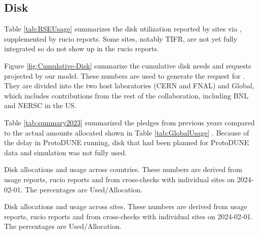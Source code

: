 \documentclass[12pt]{article}
\begin{document}
\subsection{Disk}
Table \ref{tab:RSEUsage} summarizes the disk utilization reported by sites via \cite{scotgrid}, supplemented by  rucio reports.   Some sites, notably TIFR, are not yet fully integrated so do not show up in the rucio reports.  %

Figure \ref{fig:Cumulative-Disk}  summarize the cumulative disk needs and requests projected by our model. These numbers are used to generate the request for \ThisYear.  They are divided into the two host laboratories (CERN and FNAL) and Global, which includes contributions from the rest of the collaboration, including  BNL and NERSC in the US. 

Table \ref{tab:summary2023} summarized the pledges from previous years compared to the actual amounts allocated shown in Table \ref{tab:GlobalUsage} .   Because of the delay in ProtoDUNE running, disk that had been planned for ProtoDUNE data and simulation was not fully used.  


\begin{table}[h]
\centering
{}
\caption{Disk allocations and usage across countries.    These numbers are derived from usage reports,  rucio reports and from cross-checks with individual sites on 2024-02-01.  The percentages are Used/Allocation. }
\label{tab:GlobalUsage}
\end{table}

\begin{sidewaystable}[h]
\centering
{}
\caption{Disk allocations and usage across sites.    These numbers are derived from usage reports,  rucio reports and from cross-checks with individual sites on 2024-02-01.  The percentages are Used/Allocation. }
\label{tab:RSEUsage}
\end{sidewaystable}
\end{document}
